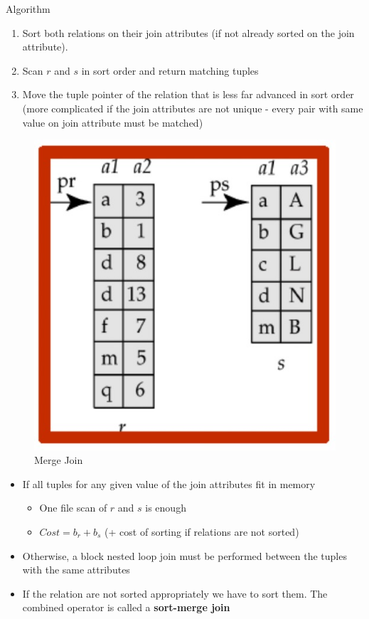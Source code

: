 \begin{minipage}{0.5\textwidth}
Algorithm
\begin{enumerate}
    \item Sort both relations on their join attributes (if not already sorted on the join attribute). 
    \item Scan $r$ and $s$ in sort order and return matching tuples 
    \item Move the tuple pointer of the relation that is less far advanced in sort order (more complicated if the join attributes are not unique - every pair with same value on join attribute must be matched)
\end{enumerate}
\end{minipage}
\hfill
\begin{minipage}{0.45\textwidth}
    \begin{figure}[H]
        \includegraphics[width=\textwidth]{images/Screenshot 2024-05-25 at 11.56.19.jpg}
        \caption{Merge Join}
    \end{figure}
\end{minipage}
\begin{itemize}[label=\(\rhd\)]
    \item If all tuples for any given value of the join attributes fit in memory
    \begin{itemize}[label=\(\rhd\)]
        \item One file scan of $r$ and $s$ is enough
        \item $Cost = b_r + b_s$ (+ cost of sorting if relations are not sorted)
    \end{itemize}
    \item Otherwise, a block nested loop join must be performed between the tuples with the same attributes
    \item If the relation are not sorted appropriately we have to sort them. The combined operator is called a \textbf{sort-merge join}
\end{itemize}


